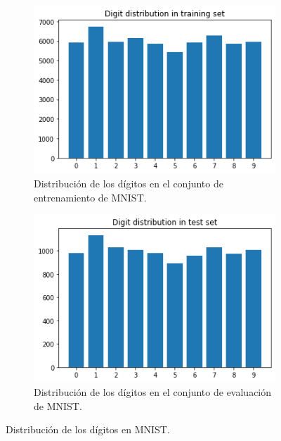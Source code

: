 \begin{figure}[h!]
    \centering
    \begin{subfigure}[b]{0.45\textwidth}
        \centering
        \includegraphics[width=\textwidth]{images/mnist/dist_train.png}
        \caption{Distribución de los dígitos en el conjunto de entrenamiento de MNIST.}
        \label{mnist7}
    \end{subfigure}
    \hspace{1cm}
    \begin{subfigure}[b]{0.45\textwidth}
        \centering
        \includegraphics[width=\textwidth]{images/mnist/dist_test.png}
        \caption{Distribución de los dígitos en el conjunto de evaluación de MNIST.}
        \label{mnist8}
    \end{subfigure}
    \caption{Distribución de los dígitos en MNIST.}
    \label{mnist_dist}
\end{figure}

